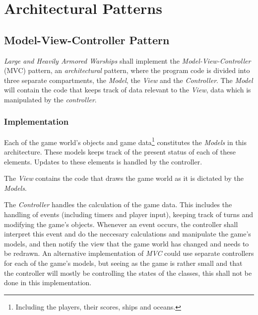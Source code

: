\chapter{Architectural Patterns}


    \section{Model-View-Controller Pattern}
    \emph{Large and Heavily Armored Warships} shall implement the \emph{Model-View-Controller} (MVC) pattern, an \emph{architectural} pattern, where the program code is divided into three separate compartments, the \emph{Model}, the \emph{View} and the \emph{Controller}. The \emph{Model} will contain the code that keeps track of data relevant to the \emph{View}, data which is manipulated by the \emph{controller}.
    
    
    
    \subsection{Implementation}
    Each of the game world's objects and game data\footnote{Including the players, their scores, ships and oceans.} constitutes the \emph{Models} in this architecture. These models keeps track of the present status of each of these elements. Updates to these elements is handled by the controller.
    
    The \emph{View} contains the code that draws the game world as it is dictated by the \emph{Models}.
    
    The \emph{Controller} handles the calculation of the game data. This includes the handling of events (including timers and player input), keeping track of turns and modifying the game's objects.
    Whenever an event occurs, the controller shall interpret this event and do the neccesary calculations and manipulate the game's models, and then notify the view that the game world has changed and needs to be redrawn.
    An alternative implementation of \emph{MVC} could use separate controllers for each of the game's models, but seeing as the game is rather small and that the controller will mostly be controlling the states of the classes, this shall not be done in this implementation.
    
